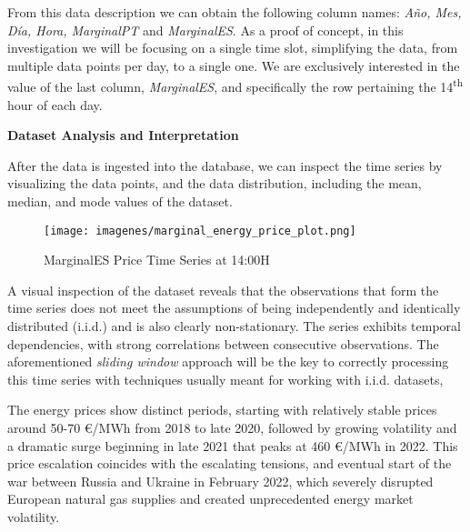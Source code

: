 \documentclass[12pt]{report} %
\begin{document}
From this data description we can obtain the following column names: \textit{Año, Mes, Día, Hora, MarginalPT} and \textit{MarginalES}. As a proof of concept, in this investigation we will be focusing on a single time slot, simplifying the data, from multiple data points per day, to a single one. We are exclusively interested in the value of the last column, \textit{MarginalES}, and specifically the row pertaining the 14\textsuperscript{th} hour of each day.


\noindent \textbf{Dataset Analysis and Interpretation}

After the data is ingested into the database, we can inspect the time series by visualizing the data points, and the data distribution, including the mean, median, and mode values of the dataset.

\begin{figure}[H]
    \centering
    \texttt{[image: imagenes/marginal\_energy\_price\_plot.png]}
    \label{fig:complete_time_series}
    \caption{MarginalES Price Time Series at 14:00H}
\end{figure}

A visual inspection of the dataset reveals that the observations that form the time series does not meet the assumptions of being independently and identically distributed (i.i.d.) and is also clearly non-stationary. The series exhibits temporal dependencies, with strong correlations between consecutive observations. The aforementioned \textit{sliding window} approach will be the key to correctly processing this time series with techniques usually meant for working with i.i.d. datasets, 


The energy prices show distinct periods, starting with relatively stable prices around 50-70 €/MWh from 2018 to late 2020, followed by growing volatility and a dramatic surge beginning in late 2021 that peaks at 460 €/MWh in 2022. This price escalation coincides with the escalating tensions, and eventual start of the war between Russia and Ukraine in February 2022, which severely disrupted European natural gas supplies and created unprecedented energy market volatility.
\end{document}
